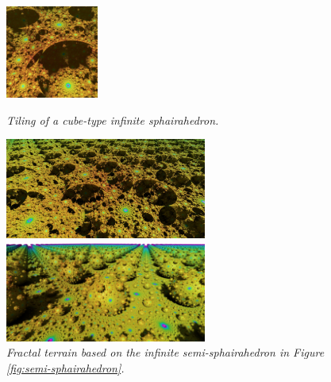 \begin{figure}[h!tbp]
\begin{minipage}[t]{0.19\textwidth}
  \label{fig:terrainStep10}
 \end{minipage}
 \hspace*{\fill}
 \begin{minipage}[t]{0.19\textwidth}
  \centering
  \includegraphics[height=1.2in, keepaspectratio]{./img/application/sphairahedron/constructFractal/terrainProcess/final.jpg}
  \label{figsphairaPrismFinal}
 \end{minipage}
 \caption{\textit{Tiling of a cube-type infinite sphairahedron.}}
 \label{fig:sphairahedralPrismTile}
\end{figure}

\begin{figure}[h!tbp]
 \begin{minipage}[t]{0.5\textwidth}
 \centering
 \includegraphics[height=1.3in, keepaspectratio]{./img/application/sphairahedron/constructFractal/terrain.jpg}
 \caption{\textit{Fractal terrain besed on the infinite sphairahedron in Figure \ref{fig:sphairahedralPrismTile}.}}
 \label{fig:terrain}
 \end{minipage}
 \hspace*{\fill}
 \begin{minipage}[t]{0.5\textwidth}
 \centering
 \includegraphics[height=1.3in, keepaspectratio]{./img/application/sphairahedron/constructFractal/semi-terrain2.png}
 \caption{\textit{Fractal terrain based on the infinite semi-sphairahedron in
  Figure \ref{fig:semi-sphairahedron}.}}
 \label{fig:semi-terrain}
 \end{minipage}
 \hspace*{\fill}
\end{figure}

